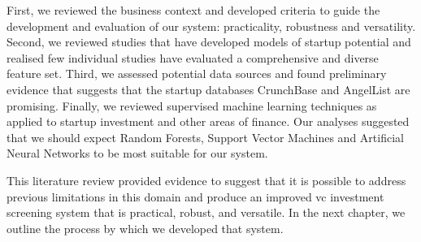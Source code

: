 \documentclass[../thesis/thesis.tex]{subfiles}
\begin{document}
First, we reviewed the business context and developed criteria to guide the development and evaluation of our system: practicality, robustness and versatility. Second, we reviewed studies that have developed models of startup potential and realised few individual studies have evaluated a comprehensive and diverse feature set. Third, we assessed potential data sources and found preliminary evidence that suggests that the startup databases CrunchBase and AngelList are promising. Finally, we reviewed supervised machine learning techniques as applied to startup investment and other areas of finance. Our analyses suggested that we should expect Random Forests, Support Vector Machines and Artificial Neural Networks to be most suitable for our system.

This literature review provided evidence to suggest that it is possible to address previous limitations in this domain and produce an improved \gls{vc} investment screening system that is practical, robust, and versatile. In the next chapter, we outline the process by which we developed that system.

\end{document}
